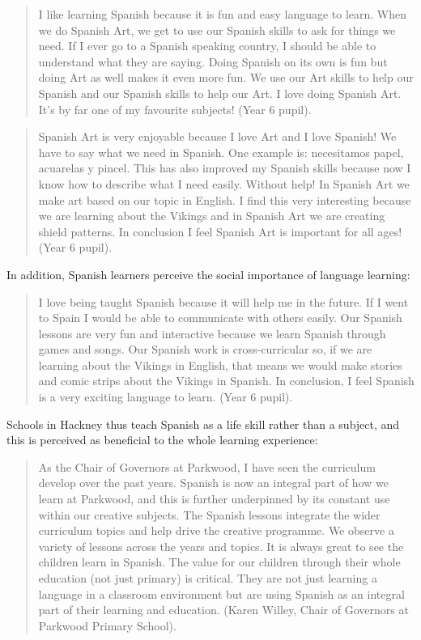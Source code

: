 \documentclass[output=paper]{langscibook}
\begin{document}
\begin{quote}
I like learning Spanish because it is fun and easy language to learn. When we do Spanish Art, we get to use our Spanish skills to ask for things we need. If I ever go to a Spanish speaking country, I should be able to understand what they are saying. Doing Spanish on its own is fun but doing Art as well makes it even more fun. We use our Art skills to help our Spanish and our Spanish skills to help our Art. I love doing Spanish Art. It’s by far one of my favourite subjects! (Year 6 pupil).
\end{quote}

\begin{quote}
Spanish Art is very enjoyable because I love Art and I love Spanish! We have to say what we need in Spanish. One example is: necesitamos papel, acuarelas y pincel. This has also improved my Spanish skills because now I know how to describe what I need easily. Without help! In Spanish Art we make art based on our topic in English. I find this very interesting because we are learning about the Vikings and in Spanish Art we are creating shield patterns. In conclusion I feel Spanish Art is important for all ages! (Year 6 pupil).
\end{quote}

\noindent In addition, Spanish learners perceive the social importance of language learning:

\begin{quote}
I love being taught Spanish because it will help me in the future. If I went to Spain I would be able to communicate with others easily. Our Spanish lessons are very fun and interactive because we learn Spanish through games and songs. Our Spanish work is cross-curricular so, if we are learning about the Vikings in English, that means we would make stories and comic strips about the Vikings in Spanish. In conclusion, I feel Spanish is a very exciting language to learn. (Year 6 pupil).
\end{quote}

\noindent Schools in Hackney thus teach Spanish as a life skill rather than a subject, and this is perceived as beneficial to the whole learning experience:

\begin{quote}
As the Chair of Governors at Parkwood, I have seen the curriculum develop over the past years. Spanish is now an integral part of how we learn at Parkwood, and this is further underpinned by its constant use within our creative subjects. The Spanish lessons integrate the wider curriculum topics and help drive the creative programme. We observe a variety of lessons across the years and topics. It is always great to see the children learn in Spanish. The value for our children through their whole education (not just primary) is critical. They are not just learning a language in a classroom environment but are using Spanish as an integral part of their learning and education. (Karen Willey, Chair of Governors at Parkwood Primary School).
\end{quote}
\end{document}
